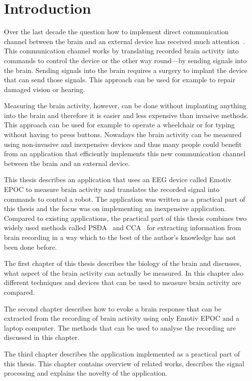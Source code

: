 
\chapter*{Introduction}

Over the last decade the question how to implement direct communication channel between the brain and an external device has received much attention~\cite{mec, cca_lin, MPCC, sc, LRT, LASSO}. This communication channel works by translating recorded brain activity into commands to control the device or the other way round---by sending signals into the brain. Sending signals into the brain requires a surgery to implant the device that can send those signals. This approach can be used for example to repair damaged vision or hearing.

Measuring the brain activity, however, can be done without implanting anything into the brain and therefore it is easier and less expensive than invasive methods. This approach can be used for example to operate a wheelchair or for typing without having to press buttons. Nowadays the brain activity can be measured using non-invasive and inexpensive devices and thus many people could benefit from an application that efficiently implements this new communication channel between the brain and an external device.

This thesis describes an application that uses an \gls{EEG} device called Emotiv EPOC to measure brain activity and translates the recorded signal into commands to control a robot. The application was written as a practical part of this thesis and the focus was on implementing an inexpensive application. Compared to existing applications, the practical part of this thesis combines two widely used methods called \gls{PSDA}~\cite{psda} and \gls{CCA}~\cite{cca_lin} for extracting information from brain recording in a way which to the best of the author's knowledge has not been done before.

The first chapter of this thesis describes the biology of the brain and discusses, what aspect of the brain activity can actually be measured. In this chapter also different techniques and devices that can be used to measure brain activity are compared.

The second chapter describes how to evoke a brain response that can be extracted from the recording of brain activity using only Emotiv EPOC and a laptop computer. The methods that can be used to analyse the recording are discussed in this chapter.

The third chapter describes the application implemented as a practical part of this thesis. This chapter contains overview of related works, describes the signal processing and explains the novelty of the application.
